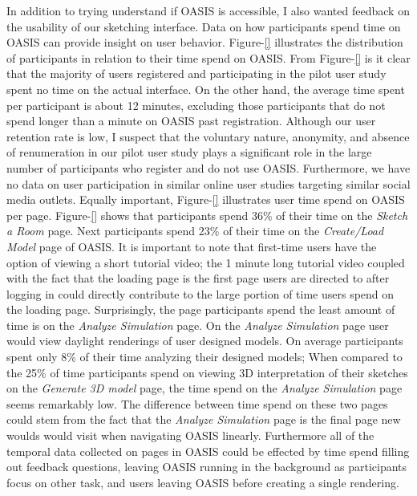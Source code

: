 In addition to trying understand if OASIS is accessible, I also wanted feedback on the usability of our sketching interface.
Data on how participants spend time on OASIS can provide insight on user behavior.
Figure-\ref{} illustrates the distribution of participants in relation to their time spend on OASIS.
From Figure-\ref{} is it clear that the majority of users registered and participating in the pilot user study spent no time on the actual interface.
On the other hand, the average time spent per participant is about 12 minutes, excluding those participants that do not spend longer than a minute on OASIS past registration.
Although our user retention rate is low, I suspect that the voluntary nature, anonymity, and absence of renumeration in our pilot user study plays a significant role in the large number of participants who register and do not use OASIS.
Furthermore, we have no data on user participation in similar online user studies targeting similar social media outlets.
Equally important, Figure-\ref{} illustrates user time spend on OASIS per page.
Figure-\ref{} shows that participants spend 36\% of their time on the \textit{Sketch a Room} page.
Next participants spend 23\% of their time on the \textit{Create/Load Model} page of OASIS.
It is important to note that first-time users have the option of viewing a short tutorial video; the 1 minute long tutorial video coupled with the fact that the loading page is the first page users are directed to after logging in could directly contribute to the large portion of time users spend on the loading page.
Surprisingly, the page participants spend the least amount of time is on the \textit{Analyze Simulation} page. 
On the \textit{Analyze Simulation} page user would view daylight renderings of user designed models.
On average participants spent only 8\% of their time analyzing their designed models;
When compared to the 25\% of time participants spend on viewing 3D interpretation of their sketches on the \textit{Generate 3D model} page, the time spend on the \textit{Analyze Simulation} page seems remarkably low.
The difference between time spend on these two pages could stem from the fact that the \textit{Analyze Simulation} page is the final page new woulds would visit when navigating OASIS linearly.
Furthermore all of the temporal data collected on pages in OASIS could be effected by time spend filling out feedback questions, leaving OASIS running in the background as participants focus on other task, and users leaving OASIS before creating a single rendering.










